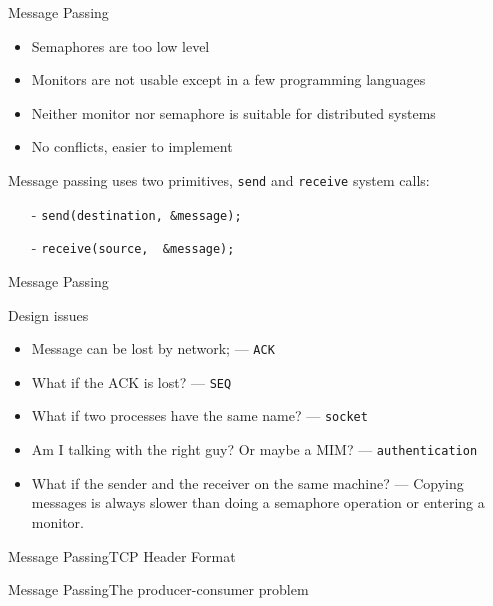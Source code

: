 \begin{frame}{Message Passing}
  \begin{itemize}
  \item Semaphores are too low level
  \item Monitors are not usable except in a few programming languages
  \item Neither monitor nor semaphore is suitable for distributed systems
  \item No conflicts, easier to implement
  \end{itemize}
  Message passing uses two primitives, \texttt{send} and \texttt{receive} system calls:
  \begin{itemize}
  \item[-] \texttt{send(destination,\ \&message);}
  \item[-] \texttt{receive(source, \ \&message);}
  \end{itemize}
\end{frame}

\begin{frame}{Message Passing}
  \begin{block}{Design issues}
    \begin{itemize}
    \item Message can be lost by network; --- \texttt{ACK}
    \item What if the ACK is lost? --- \texttt{SEQ}
    \item What if two processes have the same name? --- \texttt{socket}
    \item Am I talking with the right guy? Or maybe a MIM? --- \texttt{authentication}
    \item What if the sender and the receiver on the same machine? --- Copying messages is
      always slower than doing a semaphore operation or entering a monitor.
    \end{itemize}
  \end{block}
\end{frame}

\begin{frame}{Message Passing}{TCP Header Format}
  \begin{center}
  \end{center}
\end{frame}

\begin{frame}{Message Passing}{The producer-consumer problem}
  \begin{center}
  \end{center}
\end{frame}

